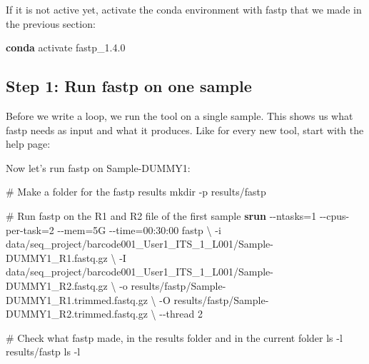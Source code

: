\documentclass[
  letterpaper,
  DIV=11,
  numbers=noendperiod]{scrreprt}
\newenvironment{Shaded}{}{}
\newcommand{\AttributeTok}[1]{\textcolor[rgb]{0.84,0.23,0.29}{#1}}
\newcommand{\BuiltInTok}[1]{\textcolor[rgb]{0.84,0.23,0.29}{#1}}
\newcommand{\CommentTok}[1]{\textcolor[rgb]{0.42,0.45,0.49}{#1}}
\newcommand{\DataTypeTok}[1]{\textcolor[rgb]{0.84,0.23,0.29}{#1}}
\newcommand{\ExtensionTok}[1]{\textcolor[rgb]{0.84,0.23,0.29}{\textbf{#1}}}
\newcommand{\FunctionTok}[1]{\textcolor[rgb]{0.44,0.26,0.76}{#1}}
\newcommand{\NormalTok}[1]{\textcolor[rgb]{0.14,0.16,0.18}{#1}}
\newcommand{\OperatorTok}[1]{\textcolor[rgb]{0.14,0.16,0.18}{#1}}
\newcommand{\VariableTok}[1]{\textcolor[rgb]{0.89,0.38,0.04}{#1}}
\begin{document}
If it is not active yet, activate the conda environment with fastp that
we made in the previous section:

\begin{Shaded}
\begin{Highlighting}[]
\ExtensionTok{conda}\NormalTok{ activate fastp\_1.4.0}
\end{Highlighting}
\end{Shaded}

\subsection{Step 1: Run fastp on one
sample}\label{step-1-run-fastp-on-one-sample}

Before we write a loop, we run the tool on a single sample. This shows
us what fastp needs as input and what it produces. Like for every new
tool, start with the help page:

\begin{Shaded}
\end{Shaded}

Now let's run fastp on Sample-DUMMY1:

\begin{Shaded}
\begin{Highlighting}[]
\CommentTok{\# Make a folder for the fastp results}
\FunctionTok{mkdir} \AttributeTok{{-}p}\NormalTok{ results/fastp}

\CommentTok{\# Run fastp on the R1 and R2 file of the first sample}
\ExtensionTok{srun} \AttributeTok{{-}{-}ntasks}\OperatorTok{=}\NormalTok{1 }\AttributeTok{{-}{-}cpus{-}per{-}task}\OperatorTok{=}\NormalTok{2 }\AttributeTok{{-}{-}mem}\OperatorTok{=}\NormalTok{5G }\AttributeTok{{-}{-}time}\OperatorTok{=}\NormalTok{00:30:00 fastp }\DataTypeTok{\textbackslash{}}
    \AttributeTok{{-}i}\NormalTok{ data/seq\_project/barcode001\_User1\_ITS\_1\_L001/Sample{-}DUMMY1\_R1.fastq.gz }\DataTypeTok{\textbackslash{}}
    \AttributeTok{{-}I}\NormalTok{ data/seq\_project/barcode001\_User1\_ITS\_1\_L001/Sample{-}DUMMY1\_R2.fastq.gz }\DataTypeTok{\textbackslash{}}
    \AttributeTok{{-}o}\NormalTok{ results/fastp/Sample{-}DUMMY1\_R1.trimmed.fastq.gz }\DataTypeTok{\textbackslash{}}
    \AttributeTok{{-}O}\NormalTok{ results/fastp/Sample{-}DUMMY1\_R2.trimmed.fastq.gz }\DataTypeTok{\textbackslash{}}
    \AttributeTok{{-}{-}thread}\NormalTok{ 2}

\CommentTok{\# Check what fastp made, in the results folder and in the current folder}
\FunctionTok{ls} \AttributeTok{{-}l}\NormalTok{ results/fastp}
\FunctionTok{ls} \AttributeTok{{-}l}
\end{Highlighting}
\end{Shaded}
\end{document}
